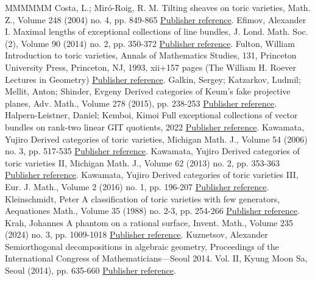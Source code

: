 \documentclass[11pt]{article}
\theoremstyle{definition}
\numberwithin{equation}{section}
\begin{document}
\begin{thebibliography}{MMMMMM}
 Costa, L.; Miró-Roig, R. M. Tilting sheaves on toric varieties, Math. Z., Volume 248 (2004) no. 4, pp. 849-865 \href{https://alco.centre-mersenne.org/articles/10.5802/alco.371/#CostaMiroRoig}{Publisher reference}.
 Efimov, Alexander I. Maximal lengths of exceptional collections of line bundles, J. Lond. Math. Soc. (2), Volume 90 (2014) no. 2, pp. 350-372 \href{https://alco.centre-mersenne.org/articles/10.5802/alco.371/#efimov}{Publisher reference}.
 Fulton, William Introduction to toric varieties, Annals of Mathematics Studies, 131, Princeton University Press, Princeton, NJ, 1993, xii+157 pages (The William H. Roever Lectures in Geometry) \href{https://alco.centre-mersenne.org/articles/10.5802/alco.371/#fultonToric}{Publisher reference}.
 Galkin, Sergey; Katzarkov, Ludmil; Mellit, Anton; Shinder, Evgeny Derived categories of Keum’s fake projective planes, Adv. Math., Volume 278 (2015), pp. 238-253 \href{https://alco.centre-mersenne.org/articles/10.5802/alco.371/#phantomsGalkin1}{Publisher reference}.
 Halpern-Leistner, Daniel; Kemboi, Kimoi Full exceptional collections of vector bundles on rank-two linear GIT quotients, 2022 \href{https://alco.centre-mersenne.org/articles/10.5802/alco.371/#DHLKK}{Publisher reference}.
 Kawamata, Yujiro Derived categories of toric varieties, Michigan Math. J., Volume 54 (2006) no. 3, pp. 517-535 \href{https://alco.centre-mersenne.org/articles/10.5802/alco.371/#kaw1}{Publisher reference}.
 Kawamata, Yujiro Derived categories of toric varieties II, Michigan Math. J., Volume 62 (2013) no. 2, pp. 353-363 \href{https://alco.centre-mersenne.org/articles/10.5802/alco.371/#kaw2}{Publisher reference}.
 Kawamata, Yujiro Derived categories of toric varieties III, Eur. J. Math., Volume 2 (2016) no. 1, pp. 196-207 \href{https://alco.centre-mersenne.org/articles/10.5802/alco.371/#kaw3}{Publisher reference}.
 Kleinschmidt, Peter A classification of toric varieties with few generators, Aequationes Math., Volume 35 (1988) no. 2-3, pp. 254-266 \href{https://alco.centre-mersenne.org/articles/10.5802/alco.371/#kle88}{Publisher reference}.
 Krah, Johannes A phantom on a rational surface, Invent. Math., Volume 235 (2024) no. 3, pp. 1009-1018 \href{https://alco.centre-mersenne.org/articles/10.5802/alco.371/#krah}{Publisher reference}.
 Kuznetsov, Alexander Semiorthogonal decompositions in algebraic geometry, Proceedings of the International Congress of Mathematicians—Seoul 2014. Vol. II, Kyung Moon Sa, Seoul (2014), pp. 635-660 \href{https://alco.centre-mersenne.org/articles/10.5802/alco.371/#KuznetsovICM}{Publisher reference}.

\end{thebibliography}
\end{document}
